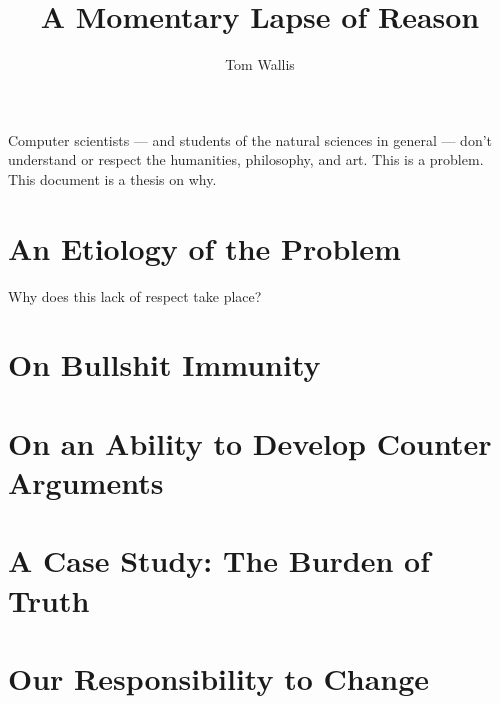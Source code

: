 \documentclass[12pt]{tufte-handout}
\title{A Momentary Lapse of Reason}
\author{Tom Wallis}
\begin{document}
\maketitle

\vspace{4em}

Computer scientists --- and students of the natural sciences in general ---
don't understand or respect the humanities, philosophy, and art.
This is a problem.
This document is a thesis on why.
\par

\section{An Etiology of the Problem}

Why does this lack of respect take place?

\section{On Bullshit Immunity}

\section{On an Ability to Develop Counter Arguments}

\section{A Case Study: The Burden of Truth}

\section{Our Responsibility to Change}
\end{document}
